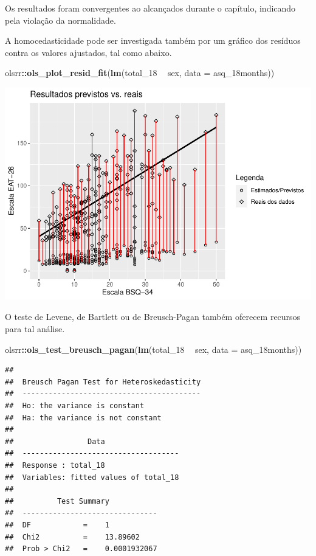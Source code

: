 \documentclass[
]{book}
\newenvironment{Shaded}{\begin{snugshade}}{\end{snugshade}}
\newcommand{\DataTypeTok}[1]{\textcolor[rgb]{0.13,0.29,0.53}{#1}}
\newcommand{\DecValTok}[1]{\textcolor[rgb]{0.00,0.00,0.81}{#1}}
\newcommand{\KeywordTok}[1]{\textcolor[rgb]{0.13,0.29,0.53}{\textbf{#1}}}
\newcommand{\NormalTok}[1]{#1}
\newcommand{\OperatorTok}[1]{\textcolor[rgb]{0.81,0.36,0.00}{\textbf{#1}}}
\newcommand{\StringTok}[1]{\textcolor[rgb]{0.31,0.60,0.02}{#1}}
\begin{document}
Os resultados foram convergentes ao alcançados durante o capítulo, indicando pela violação da normalidade.

A homocedasticidade pode ser investigada também por um gráfico dos resíduos contra os valores ajustados, tal como abaixo.

\begin{Shaded}
\begin{Highlighting}[]
\NormalTok{olsrr}\OperatorTok{::}\KeywordTok{ols_plot_resid_fit}\NormalTok{(}\KeywordTok{lm}\NormalTok{(total_}\DecValTok{18} \OperatorTok{~}\StringTok{ }\NormalTok{sex, }\DataTypeTok{data =}\NormalTok{ asq_18months))}
\end{Highlighting}
\end{Shaded}

\begin{center}\includegraphics{gitbook-demo_files/figure-latex/unnamed-chunk-84-1} \end{center}

O teste de Levene, de Bartlett ou de Breusch-Pagan também oferecem recursos para tal análise.

\begin{Shaded}
\begin{Highlighting}[]
\NormalTok{olsrr}\OperatorTok{::}\KeywordTok{ols_test_breusch_pagan}\NormalTok{(}\KeywordTok{lm}\NormalTok{(total_}\DecValTok{18} \OperatorTok{~}\StringTok{ }\NormalTok{sex, }\DataTypeTok{data =}\NormalTok{ asq_18months))}
\end{Highlighting}
\end{Shaded}

\begin{verbatim}
## 
##  Breusch Pagan Test for Heteroskedasticity
##  -----------------------------------------
##  Ho: the variance is constant            
##  Ha: the variance is not constant        
## 
##                 Data                 
##  ------------------------------------
##  Response : total_18 
##  Variables: fitted values of total_18 
## 
##          Test Summary           
##  -------------------------------
##  DF            =    1 
##  Chi2          =    13.89602 
##  Prob > Chi2   =    0.0001932067
\end{verbatim}
\end{document}
